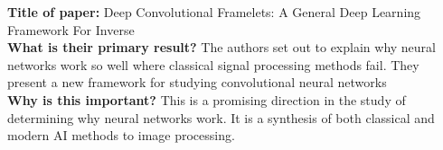 \noindent \textbf{\large Title of paper:} Deep Convolutional Framelets: A
General Deep Learning Framework For Inverse
\\

\noindent\textbf{\large What is their primary result?} %
The authors set out to explain why neural networks work so well where classical
signal processing methods fail. They present a new framework for studying
convolutional neural networks
\\

\noindent\textbf{\large Why is this important?} %
This is a promising direction in the study of determining why neural networks
work. It is a synthesis of both classical and modern AI methods to image processing.
\\



